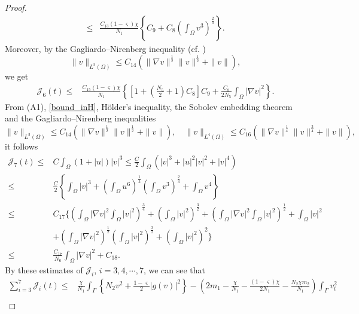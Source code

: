\documentclass{elsarticle}
\begin{document}
\begin{proof}
\begin{equation*}
\begin{split}
\leqslant&\frac{ C_{13}(1-\varsigma)\chi}{N_1}\left\{C_9+ C_8\left(\int_{\Omega}v^3\right)^{\frac{2}{3}}\right\}.
\end{split}
\end{equation*}
Moreover, by the Gagliardo--Nirenberg inequality (cf. \cite[Page 11]{nirenberg1959elliptic})
\[
\|v\|_{L^3(\Omega)}\leqslant C_{14}\left(\|\nabla v\|^{\frac{1}{2}}\| v\|^{\frac{1}{2}}+\|v\|\right),
\]
we get
\begin{equation*}
\begin{split}
\mathcal{J}_6(t)\leqslant &\frac{ C_{15}(1-\varsigma)\chi}{N_1}\left\{\left[1+ \left(\frac{N_5}{2}+1\right)C_8\right]C_9 +\frac{C_8}{2N_5} \int_{\Omega}|\nabla v|^2\right\}.
\end{split}
\end{equation*}
From (A1), \eqref{bound_inH}, H\"older's inequality, the Sobolev embedding theorem and the Gagliardo--Nirenberg inequalities
\[
\|v\|_{L^3(\Omega)}\leqslant C_{14}\left(\|\nabla v\|^{\frac{1}{2}}\| v\|^{\frac{1}{2}}+\|v\|\right), \quad \|v\|_{L^4(\Omega)}\leqslant C_{16}\left(\|\nabla v\|^{\frac{1}{4}}\| v\|^{\frac{3}{4}}+\|v\|\right),
\]
it follows
\begin{equation*}
\begin{split}
\mathcal{J}_7(t)\leqslant &C\int_{\Omega}(1+ |u|)|v|^3 \leqslant \frac{C}{2}\int_{\Omega}\left(|v|^3+ |u|^2|v|^2 + |v|^4\right)\\
\leqslant &\frac{C}{2}\left\{\int_{\Omega}|v|^3 +\left( \int_{\Omega}u^6\right)^{\frac{1}{3}}\left( \int_{\Omega}v^3\right)^{\frac{2}{3}}+\int_{\Omega}v^4\right\}\\
\leqslant &C_{17}\Bigg\{\left(\int_{\Omega}|\nabla v|^2\int_{\Omega}| v|^2\right)^{\frac{3}{4}} +\left(\int_{\Omega}|v|^2\right)^{\frac{3}{2}}+\left(\int_{\Omega}|\nabla v|^2\int_{\Omega}| v|^2\right)^{\frac{1}{2}} +\int_{\Omega}|v|^2\\
&+\left(\int_{\Omega}|\nabla v|^2\right)^{\frac{1}{2}}\left(\int_{\Omega}| v|^2\right)^{\frac{3}{2}} +\left(\int_{\Omega}|v|^2\right)^{2}\Bigg\}\\
\leqslant &\frac{C_{17}}{N_6}\int_{\Omega}|\nabla v|^2+C_{18}.
\end{split}
\end{equation*}
By these estimates of $\mathcal{J}_i$, $i=3, 4, \cdots, 7$, we can see that
\begin{equation}\label{L2-7}
\begin{split}
 \sum_{i=3}^7\mathcal{J}_i(t)\leqslant &\frac{\chi}{N_1}\int_{\Gamma}\left\{N_2 v^2+\frac{1-\varsigma}{2}|g(v)|^2\right\} -\left(2m_1-\frac{\chi}{N_1}-\frac{(1-\varsigma)\chi}{2N_1}- \frac{ N_2\chi m_2}{N_1}\right)\int_{\Gamma} v_t^2\\

\end{split}
\end{equation}
\end{proof}
\end{document}
